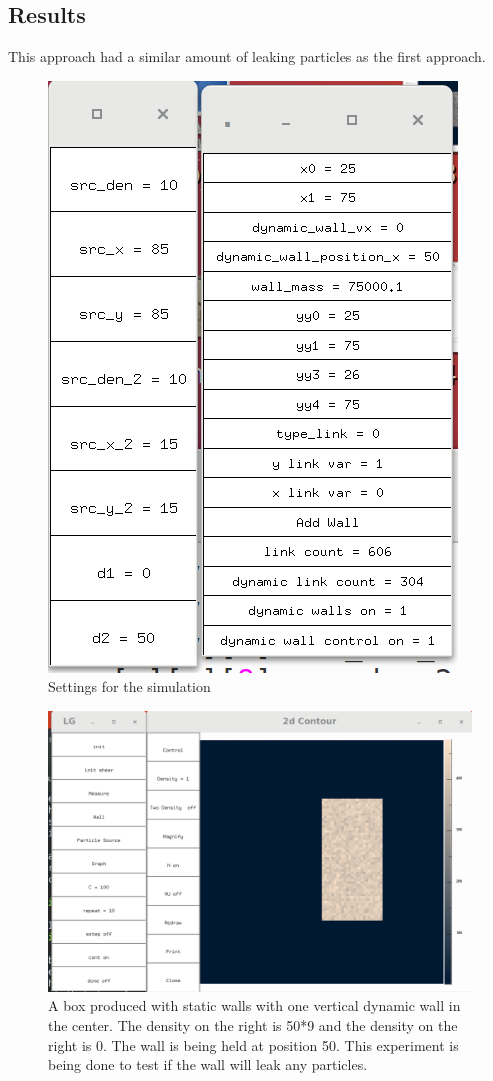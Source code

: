 \documentclass{article}
\begin{document}
\subsection{Results}

This approach had a similar amount of leaking particles as the first approach. 

\begin{figure}[H]
\includegraphics[scale=0.35]{A11p0.png}
\caption{\label{fig} Settings for the simulation}
\end{figure}


\begin{figure}[H]
\includegraphics[scale=0.35]{A11p2.png}
\caption{\label{fig} A box produced with static walls with one vertical dynamic wall in the center. The density on the right is 50*9 and the density on the right is 0. The wall is being held at position 50. This experiment is being done to test if the wall will leak any particles. }
\end{figure}
\end{document}
